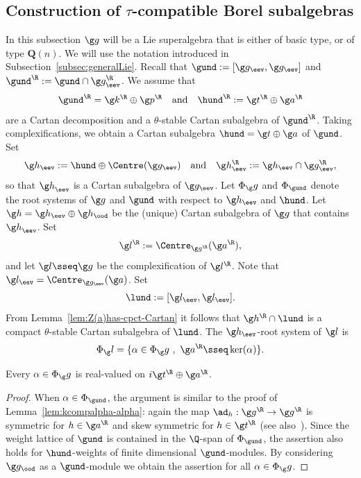 \documentclass[12pt]{amsart}
\begin{document}
\subsection{Construction of $\tau$-compatible Borel subalgebras}
\label{subsec:taucompat-construct}
In this subsection  $\g g$ will be a Lie superalgebra that  is either of basic type, or of type $\mathbf Q(n)$. We will use the notation introduced in Subsection~\ref{subsec:generalLie}. 
Recall that $\gund:=[\g g_\eev,\g g_\eev]$
and $\gund^\R:=\gund\cap \g g_\eev^\R$. We assume that    
\[
\gund^\R=\g k^\R_{}\oplus \g p^\R_{}
\quad\text{and}\quad
\hund^\R:=\g t^\R\oplus\g a^\R
\] 
are a Cartan decomposition and a $\theta$-stable Cartan subalgebra of $\gund^\R$. Taking complexifications, we obtain a Cartan subalgebra 
 $\hund=\g t\oplus \g  a$  of $\gund$. Set 
 \begin{equation}
 \label{eq:hzero}
 \g h_\eev:=\hund\oplus \Centre(\g g_\eev)\quad
 \text{and}\quad
 \g h_\eev^\R:=\g h_\eev\cap \g g_\eev^\R,
 \end{equation} 
 so that ${\g h}_\eev$ is a Cartan subalgebra of $\g g_\eev$. Let $\Phi_\g g$ and $\Phi_{\gund}$ denote the root systems   of $\g g$ and $\gund$ with respect to $\g h_\eev$ and $\hund$. Let $\g h=\g h_\eev\oplus\g h_\ood$ be the (unique) Cartan subalgebra of $\g g$ that contains ${\g h}_\eev$. 
 Set \begin{equation}
\label{lRdf}
\g l^\R:=\Centre_{\g g^\R}(\g a^\R),
\end{equation} 
and  let $\g l\sseq \g g$ be the complexification of $\g l^\R$. Note that $\g l_\eev=\Centre_{\g g_\eev}(\g a)$. Set
\begin{equation}
\label{eq:lunddfn}
\lund:=[\g l_\eev,\g l_\eev].
\end{equation} From Lemma~\ref{lem:Z(a)has-cpct-Cartan} it follows that $\g h^\R\cap\lund$ is a compact $\theta$-stable Cartan subalgebra of $\lund$. The $\g h_\eev$-root system of $\g l$ is 
\[
\Phi_\g l=\{\alpha\in\Phi_\g g\ ,\ \g a^\R\sseq \ker(\alpha)\}.
\]
\begin{lem}
\label{lem:roots-real-on-a}
 Every $\alpha\in\Phi_\g g$ is real-valued on $i\g t^\R\oplus \g a^\R$. 
\end{lem}
\begin{proof}
When $\alpha\in \Phi_{\gund}$, the argument is similar to the proof of Lemma~\ref{lem:kcompalpha-alpha}: again the map $\ad_h:\g g^\R\to\g g^\R$ is symmetric for $h\in\g a^\R$ and skew symmetric for $h\in\g t^\R$ (see also~\cite[Cor. 6.49]{Knapp}). Since the weight lattice of $\gund$ is contained in the $\Q$-span of $\Phi_{\gund}$, the assertion also holds for $\hund$-weights of finite dimensional $\gund$-modules. By considering  $\g g_\ood$  as a  $\gund$-module we obtain the assertion for all $\alpha\in\Phi_\g g$.
\end{proof}
\end{document}
